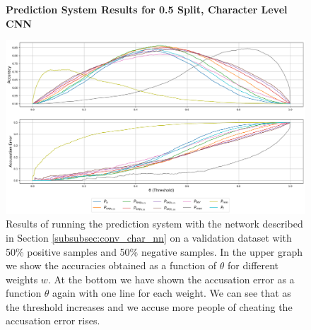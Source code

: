 \begin{figure}
    \centering
    \textbf{Prediction System Results for 0.5 Split, Character Level CNN}\par\medskip
    \includegraphics[scale=0.35]{./pictures/experiments/conv_char_nn/prediction_system_50.png}
    \caption{Results of running the prediction system with the network described
        in Section \ref{subsubsec:conv_char_nn} on a validation dataset with
        50\% positive samples and 50\% negative samples. In the upper graph we
        show the accuracies obtained as a function of $\theta$ for different
        weights $w$. At the bottom we have shown the accusation error as a
        function $\theta$ again with one line for each weight. We can see that
        as the threshold increases and we accuse more people of cheating the
        accusation error rises.}
    \label{fig:conv-char-NN-pred-50}
\end{figure}

